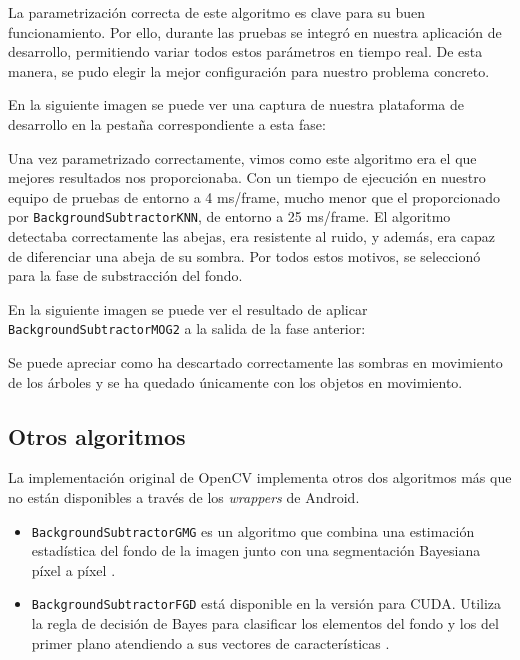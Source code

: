La parametrización correcta de este algoritmo es clave para su buen
funcionamiento. Por ello, durante las pruebas se integró en nuestra
aplicación de desarrollo, permitiendo variar todos estos parámetros en
tiempo real. De esta manera, se pudo elegir la mejor configuración para
nuestro problema concreto.

En la siguiente imagen se puede ver una captura de nuestra plataforma de
desarrollo en la pestaña correspondiente a esta fase:


Una vez parametrizado correctamente, vimos como este algoritmo era el
que mejores resultados nos proporcionaba. Con un tiempo de ejecución en
nuestro equipo de pruebas de entorno a 4 ms/frame, mucho menor que el
proporcionado por \texttt{BackgroundSubtractorKNN}, de entorno a
25 ms/frame. El algoritmo detectaba correctamente las abejas, era
resistente al ruido, y además, era capaz de diferenciar una abeja de su
sombra. Por todos estos motivos, se seleccionó para la fase de
substracción del fondo.

En la siguiente imagen se puede ver el resultado de aplicar
\\ \texttt{BackgroundSubtractorMOG2} a la salida de la fase anterior:


Se puede apreciar como ha descartado correctamente las sombras en
movimiento de los árboles y se ha quedado únicamente con los objetos en
movimiento.

\subsection{Otros algoritmos}\label{otros-algoritmos}

La implementación original de OpenCV implementa otros dos algoritmos más
que no están disponibles a través de los \emph{wrappers} de Android.

\begin{itemize}
\tightlist
\item
  \texttt{BackgroundSubtractorGMG} es un algoritmo que combina una
  estimación estadística del fondo de la imagen junto con una
  segmentación Bayesiana píxel a píxel \citep{opencv:bs_tutorial}.
\item
  \texttt{BackgroundSubtractorFGD} está disponible en la versión para
  CUDA. Utiliza la regla de decisión de Bayes para clasificar los
  elementos del fondo y los del primer plano atendiendo a sus vectores
  de características \citep{art:li_foreground_2003}.
\end{itemize}


